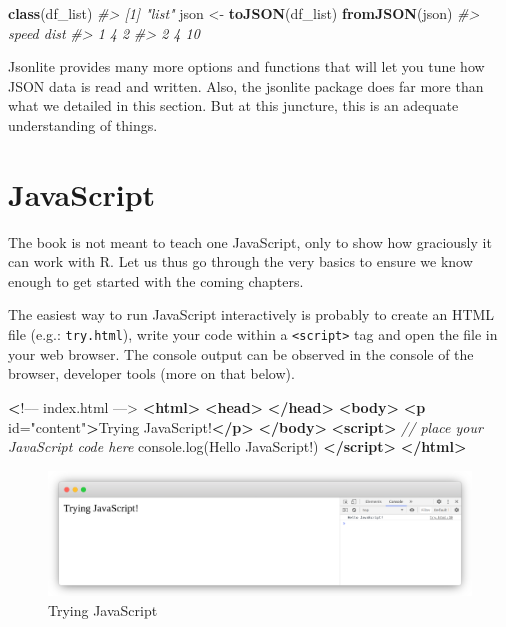 \documentclass[
]{krantz}
\makeatletter
\newenvironment{Shaded}{\begin{snugshade}}{\end{snugshade}}
\newcommand{\AttributeTok}[1]{\textcolor[rgb]{0.61,0.61,0.61}{#1}}
\newcommand{\CommentTok}[1]{\textcolor[rgb]{0.37,0.37,0.37}{\textit{#1}}}
\newcommand{\ErrorTok}[1]{\textcolor[rgb]{0.14,0.14,0.14}{\textbf{#1}}}
\newcommand{\KeywordTok}[1]{\textcolor[rgb]{0.27,0.27,0.27}{\textbf{#1}}}
\newcommand{\NormalTok}[1]{#1}
\newcommand{\OtherTok}[1]{\textcolor[rgb]{0.37,0.37,0.37}{#1}}
\newcommand{\StringTok}[1]{\textcolor[rgb]{0.5,0.5,0.5}{#1}}
\newcommand{\VariableTok}[1]{\textcolor[rgb]{0,0,0}{#1}}
\newenvironment{kframe}{%
\medskip{}
\setlength{\fboxsep}{.8em}
 \def\at@end@of@kframe{}%
 \ifinner\ifhmode%
  \def\at@end@of@kframe{\end{minipage}}%
  \begin{minipage}{\columnwidth}%
 \fi\fi%
 \def\FrameCommand##1{\hskip\@totalleftmargin \hskip-\fboxsep
 \colorbox{shadecolor}{##1}\hskip-\fboxsep
     \hskip-\linewidth \hskip-\@totalleftmargin \hskip\columnwidth}%
 \MakeFramed {\advance\hsize-\width
   \@totalleftmargin\z@ \linewidth\hsize
   \@setminipage}}%
 {\par\unskip\endMakeFramed%
 \at@end@of@kframe}
\renewenvironment{Shaded}{\begin{kframe}}{\end{kframe}}
\makeatother
\begin{document}
\begin{Shaded}
\begin{Highlighting}[]
\KeywordTok{class}\NormalTok{(df\_list)}
\CommentTok{\#> [1] "list"}
\NormalTok{json <{-}}\StringTok{ }\KeywordTok{toJSON}\NormalTok{(df\_list)}
\KeywordTok{fromJSON}\NormalTok{(json)}
\CommentTok{\#>   speed dist}
\CommentTok{\#> 1     4    2}
\CommentTok{\#> 2     4   10}
\end{Highlighting}
\end{Shaded}

Jsonlite provides many more options and functions that will let you tune how JSON data is read and written. Also, the jsonlite package does far more than what we detailed in this section. But at this juncture, this is an adequate understanding of things.

\hypertarget{basics-javascript}{%
\section{JavaScript}\label{basics-javascript}}

The book is not meant to teach one JavaScript, only to show how graciously it can work with R. Let us thus go through the very basics to ensure we know enough to get started with the coming chapters.

The easiest way to run JavaScript interactively is probably to create an HTML file (e.g.: \texttt{try.html}), write your code within a \texttt{\textless{}script\textgreater{}} tag and open the file in your web browser. The console output can be observed in the console of the browser, developer tools (more on that below).

\begin{Shaded}
\begin{Highlighting}[]
\ErrorTok{<}\NormalTok{!–– index.html ––>}
\KeywordTok{<html>}
  \KeywordTok{<head>}
  \KeywordTok{</head>}
  \KeywordTok{<body>}
    \KeywordTok{<p}\OtherTok{ id=}\StringTok{"content"}\KeywordTok{>}\NormalTok{Trying JavaScript!}\KeywordTok{</p>}
  \KeywordTok{</body>}
  \KeywordTok{<script>}
    \CommentTok{// place your JavaScript code here}
    \VariableTok{console}\NormalTok{.}\AttributeTok{log}\NormalTok{(}\StringTok{\textquotesingle{}Hello JavaScript!\textquotesingle{}}\NormalTok{)}
  \KeywordTok{</script>}
\KeywordTok{</html>}
\end{Highlighting}
\end{Shaded}

\begin{figure}[t]

{\centering \includegraphics[width=1\linewidth]{images/tryingjs} 

}

\caption{Trying JavaScript}\label{fig:trying-js}
\end{figure}
\end{document}
